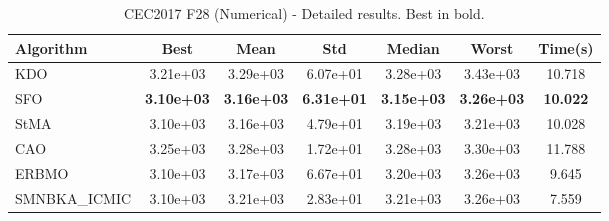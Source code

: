 \begin{table}[H]
\centering\small
\caption{CEC2017 F28 (Numerical) - Detailed results. Best in bold.}
\label{tab:cec2017_F28}
\begin{tabular}{lcccccc}
\toprule
\textbf{Algorithm} & \textbf{Best} & \textbf{Mean} & \textbf{Std} & \textbf{Median} & \textbf{Worst} & \textbf{Time(s)} \\
\midrule
KDO & 3.21e+03 & 3.29e+03 & 6.07e+01 & 3.28e+03 & 3.43e+03 & 10.718 \\
SFO & \textbf{3.10e+03} & \textbf{3.16e+03} & \textbf{6.31e+01} & \textbf{3.15e+03} & \textbf{3.26e+03} & \textbf{10.022} \\
StMA & 3.10e+03 & 3.16e+03 & 4.79e+01 & 3.19e+03 & 3.21e+03 & 10.028 \\
CAO & 3.25e+03 & 3.28e+03 & 1.72e+01 & 3.28e+03 & 3.30e+03 & 11.788 \\
ERBMO & 3.10e+03 & 3.17e+03 & 6.67e+01 & 3.20e+03 & 3.26e+03 & 9.645 \\
SMNBKA_ICMIC & 3.10e+03 & 3.21e+03 & 2.83e+01 & 3.21e+03 & 3.26e+03 & 7.559 \\
\bottomrule
\end{tabular}
\end{table}

